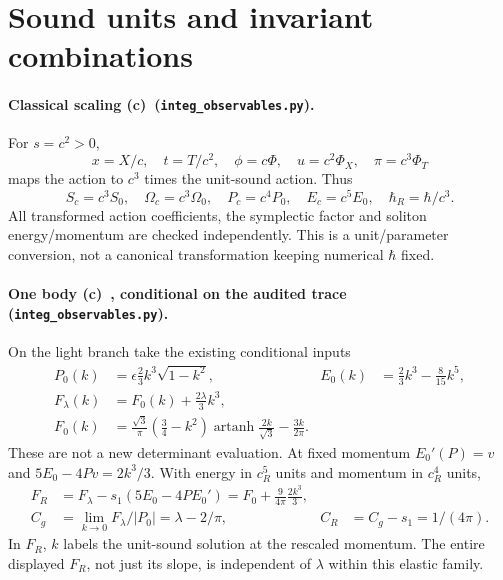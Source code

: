 \documentclass[11pt,a4paper]{article}
\newcommand{\C}{\textbf{(c)}\ }
\newcommand{\file}[1]{\nolinkurl{#1}}
\newcommand{\obs}{\file{integ_observables.py}}
\begin{document}
\section{Sound units and invariant combinations}
\paragraph{Classical scaling \C (\obs).}
For $s=c^2>0$,
\begin{equation}
 x=X/c,\quad t=T/c^2,\quad\phi=c\Phi,\quad
 u=c^2\Phi_X,\quad\pi=c^3\Phi_T
\end{equation}
maps the action to $c^3$ times the unit-sound action. Thus
\begin{equation}
 S_c=c^3S_0,\quad\Omega_c=c^3\Omega_0,\quad
 P_c=c^4P_0,\quad E_c=c^5E_0,\quad\hbar_R=\hbar/c^3.\label{scaling}
\end{equation}
All transformed action coefficients, the symplectic factor and soliton
energy/momentum are checked independently. This is a unit/parameter
conversion, not a canonical transformation keeping numerical $\hbar$ fixed.

\paragraph{One body \C, conditional on the audited trace (\obs).}
On the light branch take the existing conditional inputs
\begin{align}
 P_0(k)&=\epsilon\tfrac23k^3\sqrt{1-k^2},&
 E_0(k)&=\tfrac23k^3-\tfrac8{15}k^5,\\
 F_\lambda(k)&=F_0(k)+\tfrac{2\lambda}{3}k^3,\\
 F_0(k)&=\frac{\sqrt3}{\pi}(\tfrac34-k^2)
 \operatorname{artanh}\frac{2k}{\sqrt3}-\frac{3k}{2\pi}.
\end{align}
These are not a new determinant evaluation. At fixed momentum
$E_0'(P)=v$ and $5E_0-4Pv=2k^3/3$. With energy in $c_R^5$ units and
momentum in $c_R^4$ units,
\begin{align}
 F_R&=F_\lambda-s_1(5E_0-4PE_0')
     =F_0+\frac9{4\pi}\frac{2k^3}{3},\\
 C_g&=\lim_{k\to0}F_\lambda/|P_0|=\lambda-2/\pi,&
 C_R&=C_g-s_1=1/(4\pi).\label{onebody}
\end{align}
In $F_R$, $k$ labels the unit-sound solution at the rescaled momentum.
The entire displayed $F_R$, not just its slope, is independent of
$\lambda$ within this elastic family.
\end{document}
